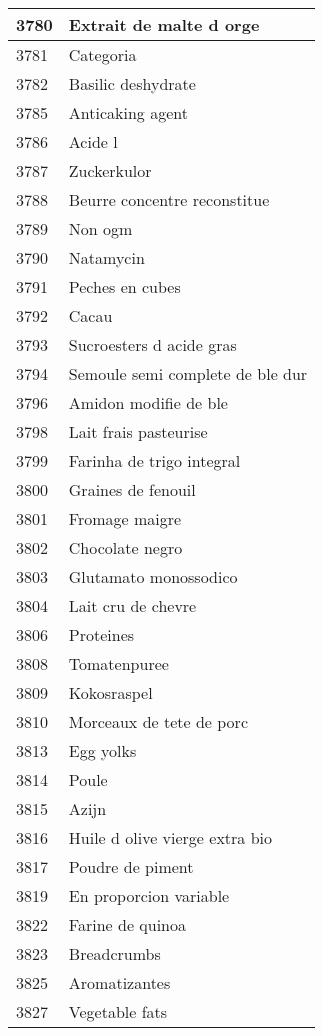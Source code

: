 \begin{longtable}{|l|l|}
3780 & Extrait de malte d orge \\ \hline 
3781 & Categoria \\ \hline 
3782 & Basilic deshydrate \\ \hline 
3785 & Anticaking agent \\ \hline 
3786 & Acide l \\ \hline 
3787 & Zuckerkulor \\ \hline 
3788 & Beurre concentre reconstitue \\ \hline 
3789 & Non ogm \\ \hline 
3790 & Natamycin \\ \hline 
3791 & Peches en cubes \\ \hline 
3792 & Cacau \\ \hline 
3793 & Sucroesters d acide gras \\ \hline 
3794 & Semoule semi complete de ble dur \\ \hline 
3796 & Amidon modifie de ble \\ \hline 
3798 & Lait frais pasteurise \\ \hline 
3799 & Farinha de trigo integral \\ \hline 
3800 & Graines de fenouil \\ \hline 
3801 & Fromage maigre \\ \hline 
3802 & Chocolate negro \\ \hline 
3803 & Glutamato monossodico \\ \hline 
3804 & Lait cru de chevre \\ \hline 
3806 & Proteines \\ \hline 
3808 & Tomatenpuree \\ \hline 
3809 & Kokosraspel \\ \hline 
3810 & Morceaux de tete de porc \\ \hline 
3813 & Egg yolks \\ \hline 
3814 & Poule \\ \hline 
3815 & Azijn \\ \hline 
3816 & Huile d olive vierge extra bio \\ \hline 
3817 & Poudre de piment \\ \hline 
3819 & En proporcion variable \\ \hline 
3822 & Farine de quinoa \\ \hline 
3823 & Breadcrumbs \\ \hline 
3825 & Aromatizantes \\ \hline 
3827 & Vegetable fats \\ \hline 

\end{longtable}
